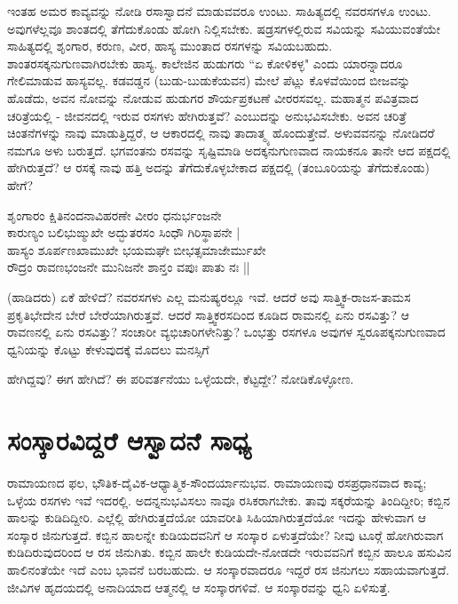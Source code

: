 ಇಂತಹ ಅಮರ ಕಾವ್ಯವನ್ನು ನೋಡಿ ರಸಾಸ್ವಾದನೆ ಮಾಡುವವರೂ ಉಂಟು. ಸಾಹಿತ್ಯದಲ್ಲಿ ನವರಸಗಳೂ ಉಂಟು. ಅವುಗಳೆಲ್ಲವೂ ಶಾಂತದಲ್ಲಿ ತೆಗೆದುಕೊಂಡು ಹೋಗಿ ನಿಲ್ಲಿಸಬೇಕು. ಷಡ್ರಸಗಳಲ್ಲಿರುವ ಸವಿಯನ್ನು ಸವಿಯುವಂತೆಯೇ ಸಾಹಿತ್ಯದಲ್ಲಿ ಶೃಂಗಾರ, ಕರುಣ, ವೀರ, ಹಾಸ್ಯ ಮುಂತಾದ ರಸಗಳನ್ನು ಸವಿಯಬಹುದು. ಶಾಂತರಸಕ್ಕನುಗುಣವಾಗಿರಬೇಕು ಹಾಸ್ಯ. ಕಾಲೇಜಿನ ಹುಡುಗರು ``ಏ ಕೋಳಿಕಳ್ಳ" ಎಂದು ಯಾರನ್ನಾದರೂ ಗೇಲಿಮಾಡುವ ಹಾಸ್ಯವಲ್ಲ. ಕಡವಡ್ಡನ (ಬುಡು-ಬುಡುಕೆಯವನ) ಮೇಲೆ ಪೆಟ್ಲು ಕೊಳವೆಯಿಂದ ಬೀಜವನ್ನು ಹೊಡೆದು, ಅವನ ನೋವನ್ನು ನೋಡುವ ಹುಡುಗರ ಶೌರ್ಯಪ್ರಕಟಣೆ ವೀರರಸವಲ್ಲ. ಮಹಾತ್ಮನ ಪವಿತ್ರವಾದ ಚರಿತ್ರೆಯಲ್ಲಿ - ಜೀವನದಲ್ಲಿ ಇರುವ ರಸಗಳು ಹೇಗಿರುತ್ತವೆ? ಎಂಬುದನ್ನು ಅನುಭವಿಸಬೇಕು. ಅವನ ಚರಿತ್ರೆ ಚಿಂತನೆಗಳನ್ನು ನಾವು ಮಾಡುತ್ತಿದ್ದರೆ, ಆ ಆಕಾರದಲ್ಲಿ ನಾವು ತಾದಾತ್ಮ್ಯ ಹೊಂದುತ್ತೇವೆ. ಅಳುವವನನ್ನು ನೋಡಿದರೆ ನಮಗೂ ಅಳು ಬರುತ್ತದೆ. ಭಗವಂತನು ರಸವನ್ನು ಸೃಷ್ಟಿಮಾಡಿ ಅದಕ್ಕನುಗುಣವಾದ ನಾಯಕನೂ ತಾನೇ ಆದ ಪಕ್ಷದಲ್ಲಿ ಹೇಗಿರುತ್ತದೆ? ಆ ರಸಕ್ಕೆ ನಾವು ಹತ್ತಿ ಅದನ್ನು ತೆಗೆದುಕೊಳ್ಳಬೇಕಾದ ಪಕ್ಷದಲ್ಲಿ (ತಂಬೂರಿಯನ್ನು ತೆಗೆದುಕೊಂಡು) ಹೇಗೆ? 

\begin{shloka}
ಶೃಂಗಾರಂ ಕ್ಷಿತಿನಂದನಾವಿಹರಣೇ ವೀರಂ ಧನುರ್ಭಂಜನೇ\\ 
ಕಾರುಣ್ಯಂ ಬಲಿಭುಙ್ಮುಖೇ ಅದ್ಭುತರಸಂ ಸಿಂಧೌ ಗಿರಿಸ್ಥಾಪನೇ |\\ 
ಹಾಸ್ಯಂ ಶೂರ್ಪಣಖಾಮುಖೇ ಭಯಮಘೇ ಬೀಭತ್ಸಮಾಜೇರ್ಮುಖೇ\\ 
ರೌದ್ರಂ ರಾವಣಭಂಜನೇ ಮುನಿಜನೇ ಶಾನ್ತಂ ವಪುಃ ಪಾತು ನಃ || 
\end{shloka}

(ಹಾಡಿದರು) ಏಕೆ ಹೇಳಿದೆ? ನವರಸಗಳು ಎಲ್ಲ ಮನುಷ್ಯರಲ್ಲೂ ಇವೆ. ಆದರೆ ಅವು ಸಾತ್ತ್ವಿಕ-ರಾಜಸ-ತಾಮಸ ಪ್ರಕೃತಿಭೇದೇನ ಬೇರೆ ಬೇರೆಯಾಗಿರುತ್ತವೆ. ಆದರೆ ಸಾತ್ತ್ವಿಕರಸದಿಂದ ಕೂಡಿದ ರಾಮನಲ್ಲಿ ಏನು ರಸವಿತ್ತು? ಆ ರಾವಣನಲ್ಲಿ ಏನು ರಸವಿತ್ತು? ಸಂಚಾರೀ ವ್ಯಭಿಚಾರಿಗಳೇನಿತ್ತು? ಒಂಭತ್ತು ರಸಗಳೂ ಅವುಗಳ ಸ್ವರೂಪಕ್ಕನುಗುಣವಾದ ಧ್ವನಿಯನ್ನು ಕೊಟ್ಟು ಕೇಳುವುದಕ್ಕೆ ಮೊದಲು ಮನಸ್ಸಿಗೆ 

ಹೇಗಿದ್ದವು? ಈಗ ಹೇಗಿದೆ? ಈ ಪರಿವರ್ತನೆಯು ಒಳ್ಳೆಯದೇ, ಕೆಟ್ಟದ್ದೇ? ನೋಡಿಕೊಳ್ಳೋಣ. 


\section*{ಸಂಸ್ಕಾರವಿದ್ದರೆ ಆಸ್ವಾದನೆ ಸಾಧ್ಯ} 

ರಾಮಾಯಣದ ಫಲ, ಭೌತಿಕ-ದೈವಿಕ-ಆಧ್ಯಾತ್ಮಿಕ-ಸೌಂದರ್ಯಾನುಭವ. ರಾಮಾಯಣವು ರಸಪ್ರಧಾನವಾದ ಕಾವ್ಯ; ಒಳ್ಳೆಯ ರಸಗಳು ಇವೆ ಇದರಲ್ಲಿ. ಅದನ್ನನುಭವಿಸಲು ನಾವೂ ರಸಿಕರಾಗಬೇಕು. ತಾವು ಸಕ್ಕರೆಯನ್ನು ತಿಂದಿದ್ದೀರಿ; ಕಬ್ಬಿನ ಹಾಲನ್ನು ಕುಡಿದಿದ್ದೀರಿ. ಎಲ್ಲೆಲ್ಲಿ ಹೇಗಿರುತ್ತದೆಯೋ ಯಾವರೀತಿ ಸಿಹಿಯಾಗಿರುತ್ತದೆಯೋ ಇದನ್ನು ಹೇಳುವಾಗ ಆ ಸಂಸ್ಕಾರ ಜಿನುಗುತ್ತದೆ. ಕಬ್ಬಿನ ಹಾಲನ್ನೇ ಕುಡಿಯದವನಿಗೆ ಆ ಸಂಸ್ಕಾರ ಏಳುತ್ತದೆಯೇ? ನೀವು ಟೂರ್‍ಗೆ ಹೋಗಿರುವಾಗ ಕುಡಿದಿರುವುದರಿಂದ ಆ ರಸ ಜಿನುಗಿತು. ಕಬ್ಬಿನ ಹಾಲೇ ಕುಡಿಯದೇ-ನೋಡದೇ ಇರುವವನಿಗೆ ಕಬ್ಬಿನ ಹಾಲೂ ಹಸುವಿನ ಹಾಲಿನಂತೆಯೇ ಇದೆ ಎಂಬ ಭಾವನೆ ಬರಬಹುದು. ಆ ಸಂಸ್ಕಾರವಾದರೂ ಇದ್ದರೆ ರಸ ಜಿನುಗಲು ಸಹಾಯವಾಗುತ್ತದೆ. ಜೀವಿಗಳ ಹೃದಯದಲ್ಲಿ ಅನಾದಿಯಾದ ಆತ್ಮನಲ್ಲಿ ಆ ಸಂಸ್ಕಾರಗಳಿವೆ. ಆ ಸಂಸ್ಕಾರವನ್ನು ಧ್ವನಿ ಏಳಿಸುತ್ತೆ. 

